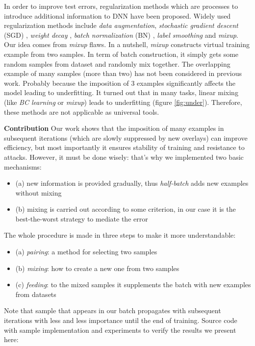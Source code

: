 \documentclass{article}
\begin{document}
In order to improve test errors, regularization methods which are processes to
introduce additional information to DNN have been proposed\cite{miyato2018virtual}. Widely
used regularization methods include \emph{data augmentation}, \emph{stochastic
	gradient descent} (SGD) \cite{zhang2016understanding}, \emph{weight decay}
\cite{krogh1992simple}, \emph{batch normalization} (BN) \cite{ioffe2015batch},
\emph{label
	smoothing}\cite{szegedy2016rethinking} and \emph{mixup}\cite{zhang2017mixup}.
%
Our idea comes from \emph{mixup} flaws. In a nutshell, \emph{mixup} constructs
virtual training example from two samples. In term of batch construction, it
simply gets some random samples from dataset and randomly mix together.
%
The overlapping example of many samples (more than two) has not been considered
in previous work. Probably because the imposition of 3 examples significantly affects the model leading to underfitting.
%
It turned out that in many tasks, linear mixing (like \emph{BC learning} or
\emph{mixup}) leads to underfitting (figure \ref{fig:under}). Therefore, these methods are not applicable as universal tools.

\textbf{Contribution} Our work shows that the imposition of many examples in
subsequent iterations (which are slowly suppressed by new overlays) can improve efficiency, but most importantly it ensures stability of training and resistance to attacks.
%
However, it must be done wisely: that's why we implemented two basic mechanisms:
\begin{itemize}
\item (a) new information is provided gradually, thus \emph{half-batch} adds
new examples without mixing
\item (b) mixing is carried out according to some criterion, in our case it is the
best-the-worst strategy to mediate the error
\end{itemize}
%
The whole procedure is made in three steps to make it more understandable:
\begin{itemize}
\item (a) \emph{pairing}: a method for selecting two samples
\item (b) \emph{mixing}: how to create a new one from two samples
\item (c) \emph{feeding}: to the mixed samples it supplements the batch with new examples
from datasets
\end{itemize}
%
Note that sample that appears in our batch propagates with
subsequent iterations with less and less importance until the end of training.
%
Source code with sample implementation and experiments to verify the results
we present here:
\end{document}
